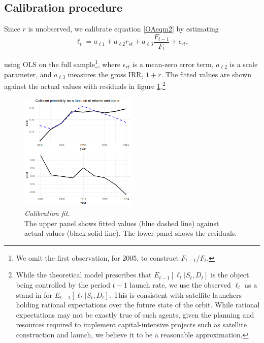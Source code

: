 \documentclass[12pt]{article}
\begin{document}
\subsection{Calibration procedure}

Since $r$ is unobserved, we calibrate equation \ref{OAeqm2} by estimating
\begin{equation}
\label{empiricalEqn}
\ell_t = a_{\ell 1} + a_{\ell 2} r_{st} + a_{\ell 3} \frac{F_{t-1}}{F_t} + \epsilon_{r t},
\end{equation}

using OLS on the full sample\footnote{We omit the first observation, for 2005, to construct $F_{t-1}/F_{t}$.}, where $\epsilon_{rt}$ is a mean-zero error term, $a_{\ell 2}$ is a scale parameter, and $a_{\ell 3}$ measures the gross IRR, $1+r$. The fitted values are shown against the actual values with residuals in figure \ref{econCalibration}.\footnote{While the theoretical model prescribes that $E_{t-1}[\ell_t|S_t,D_t]$ is the object being controlled by the period $t-1$ launch rate, we use the observed $\ell_t$ as a stand-in for $E_{t-1}[\ell_t|S_t,D_t]$. This is consistent with satellite launchers holding rational expectations over the future state of the orbit. While rational expectations may not be exactly true of such agents, given the planning and resources required to implement capital-intensive projects such as satellite construction and launch, we believe it to be a reasonable approximation.}

\begin{figure}[H]
	\centering
	\includegraphics[width=0.5\textwidth]{../../images/risk_return_plot.png}
	\captionsetup{format=hang}
	\caption{\textit{Calibration fit.} \\
		The upper panel shows fitted values (blue dashed line) against actual values (black solid line). The lower panel shows the residuals.
	}
	\label{econCalibration}
\end{figure}
\end{document}
